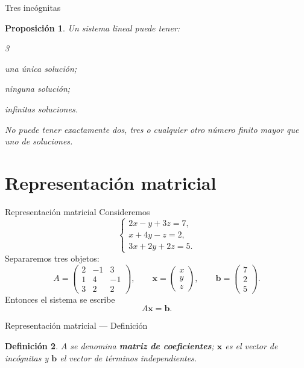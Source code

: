 \documentclass[aspectratio=169,11pt]{beamer}
\newtheorem{definicion}{Definición}[section]
\newtheorem{proposicion}[definicion]{Proposición}
\theoremstyle{remark}
\begin{document}
\begin{frame}[shrink=5]{Tres incógnitas}
\footnotesize
\begin{proposicion}
Un sistema lineal puede tener:
\begin{itemize}
\begin{multicols}{3}
\item una única solución;
\item ninguna solución;
\item infinitas soluciones.
\end{multicols}
\end{itemize}
No puede tener exactamente dos, tres o cualquier otro número finito mayor que uno de soluciones.
\end{proposicion}
\end{frame}

\section{Representación matricial}
\begin{frame}[allowframebreaks]{Representación matricial}
\footnotesize
Consideremos
\[
\begin{cases}
2x-y+3z=7,\\
x+4y-z=2,\\
3x+2y+2z=5.
\end{cases}
\]
Separaremos tres objetos:
\[
A=
\begin{pmatrix}
2&-1&3\\
1&4&-1\\
3&2&2
\end{pmatrix},
\qquad
\mathbf{x}=
\begin{pmatrix}x\\y\\z\end{pmatrix},
\qquad
\mathbf{b}=
\begin{pmatrix}7\\2\\5\end{pmatrix}.
\]
Entonces el sistema se escribe
\[
A\mathbf{x}=\mathbf{b}.
\]
\end{frame}

\begin{frame}[shrink=5]{Representación matricial — Definición}
\footnotesize
\begin{definicion}
$A$ se denomina \textbf{matriz de coeficientes}; $\mathbf{x}$ es el vector de incógnitas y
$\mathbf{b}$ el vector de términos independientes.
\end{definicion}
\end{frame}
\end{document}
